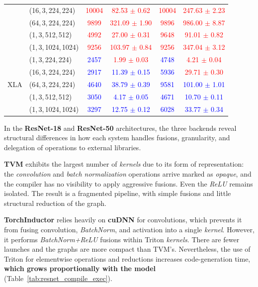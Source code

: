 \documentclass[sigconf,anonymous]{acmart}
\newcommand{\best}[1]{\textcolor{blue}{#1}}
\newcommand{\worst}[1]{\textcolor{red}{#1}}
\begin{document}
\begin{table}[t]
{\begin{tabular}{ll cc cc}
& (16,\,3,\,224,\,224)  & \worst{10004} & \worst{82.53 $\pm$ 0.62}  & \worst{10004} & \worst{247.63 $\pm$ 2.23} \\
& (64,\,3,\,224,\,224)  & \worst{9899}  & \worst{321.09 $\pm$ 1.90} & \worst{9896}  & \worst{986.00 $\pm$ 8.87} \\
& (1,\,3,\,512,\,512)   & \worst{4992}  & \worst{27.00 $\pm$ 0.31}  & \worst{9648}  & \worst{91.01 $\pm$ 0.82} \\
& (1,\,3,\,1024,\,1024) & \worst{9256}  & \worst{103.97 $\pm$ 0.84} & \worst{9256}  & \worst{347.04 $\pm$ 3.12} \\
\midrule
\multirow{5}{*}{XLA}
& (1,\,3,\,224,\,224)   & \best{2457} & \worst{1.99 $\pm$ 0.03}  & \best{4748} & \worst{4.21 $\pm$ 0.04} \\
& (16,\,3,\,224,\,224)  & \best{2917} & \best{11.39 $\pm$ 0.15}  & \best{5936} & \worst{29.71 $\pm$ 0.30} \\
& (64,\,3,\,224,\,224)  & \best{4640} & \best{38.79 $\pm$ 0.39}  & \best{9581} & \best{101.00 $\pm$ 1.01} \\
& (1,\,3,\,512,\,512)   & \best{3050} & \best{4.17 $\pm$ 0.05}   & \best{4671} & \best{10.70 $\pm$ 0.11} \\
& (1,\,3,\,1024,\,1024) & \best{3297} & \best{12.75 $\pm$ 0.12}  & \best{6028} & \best{33.77 $\pm$ 0.34} \\
\bottomrule
\end{tabular}
}
\end{table}

In the \textbf{ResNet-18} and \textbf{ResNet-50} architectures, the three backends reveal structural differences in how each system handles fusions, granularity, and delegation of operations to external libraries.

\textbf{TVM} exhibits the largest number of \emph{kernels} due to its form of representation: the \textit{convolution} and \textit{batch normalization} operations arrive marked as \emph{opaque}, and the compiler has no visibility to apply aggressive fusions. Even the \textit{ReLU} remains isolated. The result is a fragmented pipeline, with simple fusions and little structural reduction of the graph.

\textbf{TorchInductor} relies heavily on \textbf{cuDNN} for convolutions, which prevents it from fusing convolution, \textit{BatchNorm}, and activation into a single \textit{kernel}. However, it performs \textit{BatchNorm+ReLU} fusions within Triton \emph{kernels}. There are fewer launches and the graphs are more compact than TVM's. Nevertheless, the use of Triton for elementwise operations and reductions increases code-generation time, \textbf{which grows proportionally with the model} (Table~\ref{tab:resnet_compile_exec}).
\end{document}
